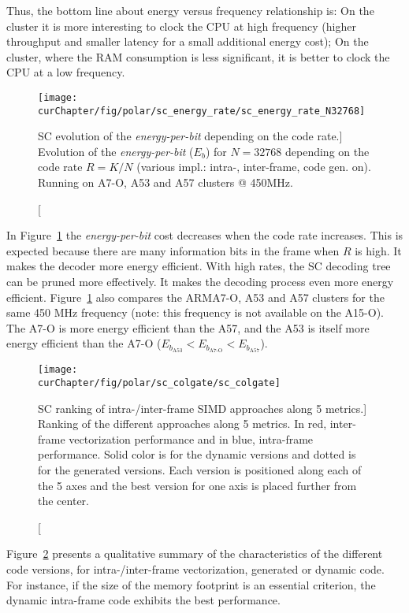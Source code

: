 Thus, the bottom line about energy versus frequency relationship is: On the \little
cluster it is more interesting to clock the CPU at high frequency (higher
throughput and smaller latency for a small additional energy cost); On the
\bigARM cluster, where the RAM consumption is less significant, it is better to
clock the CPU at a low frequency.

\begin{figure}[htp]
  \centering
  \texttt{[image: \\curChapter/fig/polar/sc\_energy\_rate/sc\_energy\_rate\_N32768]}
  \caption
    [SC evolution of the \emph{energy-per-bit} depending on the code rate.]
    {Evolution of the \emph{energy-per-bit} ($E_b$) for $N = 32768$ depending on
    the code rate $R = K / N$ (various impl.: intra-, inter-frame, code gen.
    on). Running on A7-O, A53 and A57 clusters @ 450MHz.}
  \label{plot:eval_polar_sc_energy_rate}
\end{figure}

In Figure~\ref{plot:eval_polar_sc_energy_rate} the \emph{energy-per-bit} cost
decreases when the code rate increases. This is expected because there are many
information bits in the frame when $R$ is high. It makes the decoder more
energy efficient. With high rates, the SC decoding tree can be pruned more
effectively. It makes the decoding process even more energy efficient.
Figure~\ref{plot:eval_polar_sc_energy_rate} also compares the ARM\R A7-O, A53
and A57 clusters for the same 450 MHz frequency (note: this frequency is not
available on the A15-O). The \little A7-O is more energy efficient than the
\bigARM A57, and the \little A53 is itself more energy efficient than the
\little A7-O ($E_{b_{\text{A53}}} < E_{b_{\text{A7-O}}} < E_{b_{\text{A57}}}$).

\begin{figure}[htp]
  \centering
  \texttt{[image: \\curChapter/fig/polar/sc\_colgate/sc\_colgate]}
  \caption
    [SC ranking of intra-/inter-frame SIMD approaches along 5 metrics.]
    {Ranking of the different approaches along
     5 metrics. In red, inter-frame vectorization performance and in blue,
     intra-frame performance. Solid color is for the dynamic versions and dotted
     is for the generated versions. Each version is positioned along each of the
     5 axes and the best version for one axis is placed further from the
     center.}
  \label{fig:eval_polar_sc_colgate}
\end{figure}

Figure~\ref{fig:eval_polar_sc_colgate} presents a qualitative summary of the
characteristics of the different code versions, for intra-/inter-frame
vectorization, generated or dynamic code. For instance, if the size of
the memory footprint is an essential criterion, the dynamic intra-frame
code exhibits the best performance.

